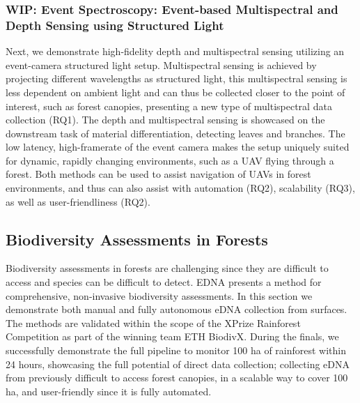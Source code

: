 \subsubsection{WIP: Event Spectroscopy: Event-based Multispectral and Depth Sensing using Structured Light}


Next, we demonstrate high-fidelity depth and multispectral sensing utilizing an event-camera structured light setup. Multispectral sensing is achieved by projecting different wavelengths as structured light, this multispectral sensing is less dependent on ambient light and can thus be collected closer to the point of interest, such as forest canopies, presenting a new type of multispectral data collection (RQ1). The depth and multispectral sensing is showcased on the downstream task of material differentiation, detecting leaves and branches. The low latency, high-framerate of the event camera makes the setup uniquely suited for dynamic, rapidly changing environments, such as a UAV flying through a forest. Both methods can be used to assist navigation of UAVs in forest environments, and thus can also assist with automation (RQ2), scalability (RQ3), as well as user-friendliness (RQ2).


\subsection{Biodiversity Assessments in Forests}


Biodiversity assessments in forests are challenging since they are difficult to access and species can be difficult to detect. EDNA presents a method for comprehensive, non-invasive biodiversity assessments. In this section we demonstrate both manual and fully autonomous eDNA collection from surfaces. The methods are validated within the scope of the XPrize Rainforest Competition as part of the winning team ETH BiodivX. During the finals, we successfully demonstrate the full pipeline to monitor 100 ha of rainforest within 24 hours, showcasing the full potential of direct data collection; collecting eDNA from previously difficult to access forest canopies, in a scalable way to cover 100 ha, and user-friendly since it is fully automated.

